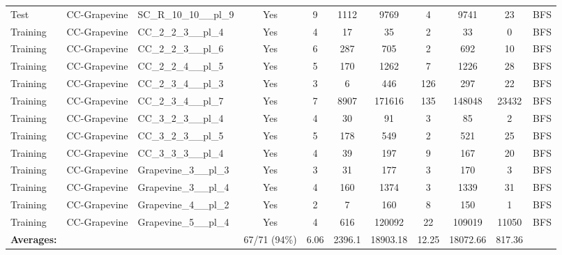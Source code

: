 \documentclass{article}
\begin{document}
\begin{tabular}{lllcccccccc}
Test & CC-Grapevine & SC\_R\_10\_10\_\_pl\_9 & Yes & 9 & 1112 & 9769 & 4 & 9741 & 23 & BFS \\
Training & CC-Grapevine & CC\_2\_2\_3\_\_pl\_4 & Yes & 4 & 17 & 35 & 2 & 33 & 0 & BFS \\
Training & CC-Grapevine & CC\_2\_2\_3\_\_pl\_6 & Yes & 6 & 287 & 705 & 2 & 692 & 10 & BFS \\
Training & CC-Grapevine & CC\_2\_2\_4\_\_pl\_5 & Yes & 5 & 170 & 1262 & 7 & 1226 & 28 & BFS \\
Training & CC-Grapevine & CC\_2\_3\_4\_\_pl\_3 & Yes & 3 & 6 & 446 & 126 & 297 & 22 & BFS \\
Training & CC-Grapevine & CC\_2\_3\_4\_\_pl\_7 & Yes & 7 & 8907 & 171616 & 135 & 148048 & 23432 & BFS \\
Training & CC-Grapevine & CC\_3\_2\_3\_\_pl\_4 & Yes & 4 & 30 & 91 & 3 & 85 & 2 & BFS \\
Training & CC-Grapevine & CC\_3\_2\_3\_\_pl\_5 & Yes & 5 & 178 & 549 & 2 & 521 & 25 & BFS \\
Training & CC-Grapevine & CC\_3\_3\_3\_\_pl\_4 & Yes & 4 & 39 & 197 & 9 & 167 & 20 & BFS \\
Training & CC-Grapevine & Grapevine\_3\_\_pl\_3 & Yes & 3 & 31 & 177 & 3 & 170 & 3 & BFS \\
Training & CC-Grapevine & Grapevine\_3\_\_pl\_4 & Yes & 4 & 160 & 1374 & 3 & 1339 & 31 & BFS \\
Training & CC-Grapevine & Grapevine\_4\_\_pl\_2 & Yes & 2 & 7 & 160 & 8 & 150 & 1 & BFS \\
Training & CC-Grapevine & Grapevine\_5\_\_pl\_4 & Yes & 4 & 616 & 120092 & 22 & 109019 & 11050 & BFS \\
\textbf{Averages:} & & & 67/71 (94\%) & 6.06 & 2396.1 & 18903.18 & 12.25 & 18072.66 & 817.36 & \\
\bottomrule
\end{tabular}
\newpage
\end{document}
